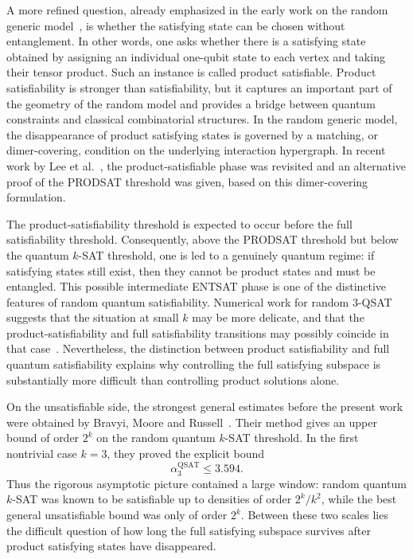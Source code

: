 \documentclass[11pt]{article}
\begin{document}
A more refined question, already emphasized in the early work on the random
generic model~\cite{LLMSS10}, is whether the satisfying state can be chosen
without entanglement.  In other words, one asks whether there is a satisfying
state obtained by assigning an individual one-qubit state to each vertex and
taking their tensor product.  Such an instance is called product satisfiable.
Product satisfiability is stronger than satisfiability, but it captures an
important part of the geometry of the random model and provides a bridge
between quantum constraints and classical combinatorial structures.  In the
random generic model, the disappearance of product satisfying states is
governed by a matching, or dimer-covering, condition on the underlying
interaction hypergraph.  In recent work by Lee et al.~\cite{LMRV24}, the
product-satisfiable phase was revisited and an alternative proof of the
PRODSAT threshold was given, based on this dimer-covering formulation.

The product-satisfiability threshold is expected to occur before the full
satisfiability threshold.  Consequently, above the PRODSAT threshold but below
the quantum \(k\)-SAT threshold, one is led to a genuinely quantum regime: if
satisfying states still exist, then they cannot be product states and must be
entangled.  This possible intermediate ENTSAT phase is one of the distinctive
features of random quantum satisfiability.  Numerical work for random
\(3\)-QSAT suggests that the situation at small \(k\) may be more delicate,
and that the product-satisfiability and full satisfiability transitions may
possibly coincide in that case~\cite{MorampudiHSLM17}.
Nevertheless, the distinction between product satisfiability and full quantum
satisfiability explains why controlling the full satisfying subspace is
substantially more difficult than controlling product solutions alone.

On the unsatisfiable side, the strongest general estimates before the present
work were obtained by Bravyi, Moore and Russell~\cite{BMR}.  Their method gives
an upper bound of order \(2^k\) on the random quantum \(k\)-SAT threshold.  In
the first nontrivial case \(k=3\), they proved the explicit bound
\[
\alpha^{\mathrm{QSAT}}_3 \leq 3.594 .
\]
Thus the rigorous asymptotic picture contained a large window: random quantum
\(k\)-SAT was known to be satisfiable up to densities of order \(2^k/k^2\),
while the best general unsatisfiable bound was only of order \(2^k\).  Between
these two scales lies the difficult question of how long the full satisfying
subspace survives after product satisfying states have disappeared.
\end{document}
